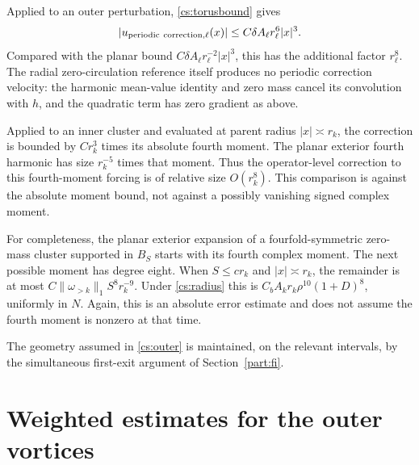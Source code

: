 \documentclass[11pt]{amsart}
\theoremstyle{remark}
\numberwithin{equation}{section}
\begin{document}
Applied to an outer perturbation, \eqref{cs:torusbound} gives
\[
 |u_{\rm periodic\ correction,\ell}(x)|
 \le C\delta A_\ell r_\ell^6|x|^3.
\]
Compared with the planar bound $C\delta A_\ell r_\ell^{-2}|x|^3$, this has the additional factor $r_\ell^8$. The radial zero-circulation reference itself produces no periodic correction velocity: the harmonic mean-value identity and zero mass cancel its convolution with $h$, and the quadratic term has zero gradient as above.

Applied to an inner cluster and evaluated at parent radius $|x|\asymp r_k$, the correction is bounded by $Cr_k^3$ times its absolute fourth moment. The planar exterior fourth harmonic has size $r_k^{-5}$ times that moment. Thus the operator-level correction to this fourth-moment forcing is of relative size $O(r_k^8)$. This comparison is against the absolute moment bound, not against a possibly vanishing signed complex moment.

For completeness, the planar exterior expansion of a fourfold-symmetric zero-mass cluster supported in $B_S$ starts with its fourth complex moment. The next possible moment has degree eight. When $S\le c r_k$ and $|x|\asymp r_k$, the remainder is at most $C\|\omega_{>k}\|_1 S^8r_k^{-9}$. Under \eqref{cs:radius} this is $C_bA_kr_k\rho^{10}(1+D)^8$, uniformly in $N$. Again, this is an absolute error estimate and does not assume the fourth moment is nonzero at that time.

The geometry assumed in \eqref{cs:outer} is maintained, on the relevant
intervals, by the simultaneous first-exit argument of Section~\ref{part:fi}.



\section{Weighted estimates for the outer vortices}\label{part:ca}
\end{document}
